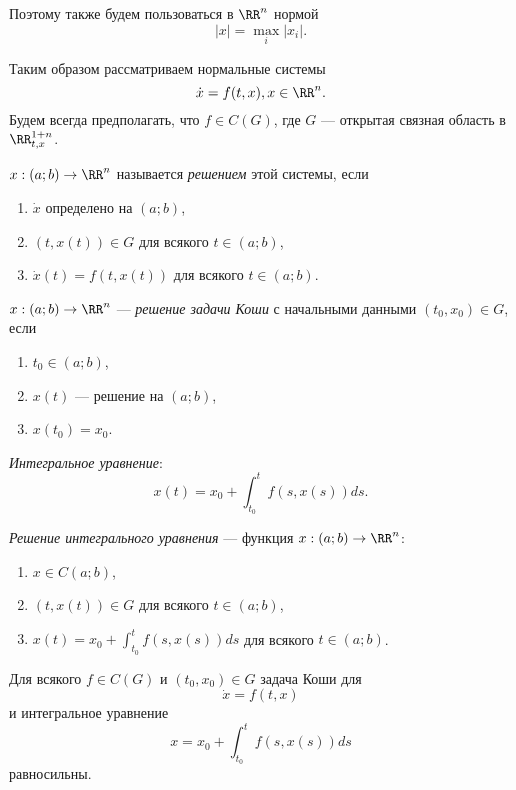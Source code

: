 \documentclass[12pt,a4paper]{article}
\begin{document}
    Поэтому также будем пользоваться в $\RR^n$ нормой
    \[|x| = \max_i |x_i|.\]

    Таким образом рассматриваем нормальные системы
    \[\dot{x} = f(t, x), x \in \RR^n.\]
    Будем всегда предполагать, что $f \in C(G)$, где $G$ --- открытая связная область в $\RR^{1+n}_{t, x}$.

    \begin{definition}
        $x: (a; b) \to \RR^n$ называется \emph{решением} этой системы, если
        \begin{enumerate}
            \item $\dot{x}$ определено на $(a; b)$,
            \item $(t, x(t)) \in G$ для всякого $t \in (a; b)$,
            \item $\dot{x}(t) = f(t, x(t))$ для всякого $t \in (a; b)$.
        \end{enumerate}
    \end{definition}

    \begin{definition}
        $x: (a; b) \to \RR^n$ --- \emph{решение задачи Коши} с начальными данными $(t_0, x_0) \in G$, если
        \begin{enumerate}
            \item $t_0 \in (a; b)$,
            \item $x(t)$ --- решение на $(a; b)$,
            \item $x(t_0) = x_0$.
        \end{enumerate}
    \end{definition}

    \begin{definition}
        \emph{Интегральное уравнение}:
        \[x(t) = x_0 + \int_{t_0}^t f(s, x(s)) ds.\]

        \emph{Решение интегрального уравнения} --- функция $x: (a; b) \to \RR^n$:
        \begin{enumerate}
            \item $x \in C(a; b)$,
            \item $(t, x(t)) \in G$ для всякого $t \in (a; b)$,
            \item $x(t) = x_0 + \int_{t_0}^t f(s, x(s)) ds$ для всякого $t \in (a; b)$.
        \end{enumerate}
    \end{definition}

    \begin{lemma}
        Для всякого $f \in C(G)$ и $(t_0, x_0) \in G$ задача Коши для
        \[\dot{x} = f(t, x)\]
        и интегральное уравнение
        \[x = x_0 + \int_{t_0}^t f(s, x(s)) ds\]
        равносильны.
    \end{lemma}
\end{document}
